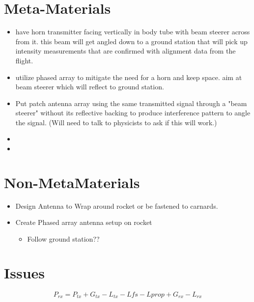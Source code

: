 \documentclass{article}
\begin{document}
	
	\section{Meta-Materials}
	\begin{itemize}
		\item have horn transmitter facing vertically in body tube with beam steerer across from it. this beam will get angled down to a ground station that will pick up intensity measurements that are confirmed with alignment data from the flight. 
		\item utilize phased array to mitigate the need for a horn and keep space. aim at beam steerer which will reflect to ground station.
		\item Put patch antenna array using the same transmitted signal through a "beam steerer" without its reflective backing to produce interference pattern to angle the signal. (Will need to talk to physicists to ask if this will work.)
		\item 
		\item 
	\end{itemize}
	
	\section{Non-MetaMaterials}	
	\begin{itemize}
		\item Design Antenna to Wrap around rocket or be fastened to carnards.
		\item Create Phased array antenna setup on rocket \begin{itemize}
			\item Follow ground station??
		\end{itemize}
		
	\end{itemize}
	
	\section{Issues}

\begin{equation} 
	P_{rx}=P_{tx}+G_{tx}-L_{tx}-L{fs}-L{prop}+G_{rx}-L_{rx}
	\label{eq:Link Budget Equation} 
\end{equation}
\end{document}
